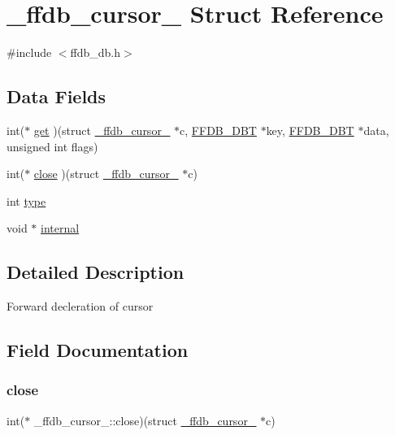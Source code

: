 \hypertarget{struct__ffdb__cursor__}{}\section{\+\_\+ffdb\+\_\+cursor\+\_\+ Struct Reference}
\label{struct__ffdb__cursor__}


{\ttfamily \#include $<$ffdb\+\_\+db.\+h$>$}

\subsection*{Data Fields}
\begin{DoxyCompactItemize}
\item 
int($\ast$ \mbox{\hyperlink{struct__ffdb__cursor___a775458eba1f9b1d69b9b394faaf31ae2}{get}} )(struct \mbox{\hyperlink{struct__ffdb__cursor__}{\+\_\+ffdb\+\_\+cursor\+\_\+}} $\ast$c, \mbox{\hyperlink{other__libs_2filedb_2filehash_2ffdb__db_8h_aa2e0984399491df0fdd20898ca8758f9}{F\+F\+D\+B\+\_\+\+D\+BT}} $\ast$key, \mbox{\hyperlink{other__libs_2filedb_2filehash_2ffdb__db_8h_aa2e0984399491df0fdd20898ca8758f9}{F\+F\+D\+B\+\_\+\+D\+BT}} $\ast$data, unsigned int flags)
\item 
int($\ast$ \mbox{\hyperlink{struct__ffdb__cursor___a68eb849c2cd709a772c6168920d98c66}{close}} )(struct \mbox{\hyperlink{struct__ffdb__cursor__}{\+\_\+ffdb\+\_\+cursor\+\_\+}} $\ast$c)
\item 
int \mbox{\hyperlink{struct__ffdb__cursor___a19f215e12f2d09687f089c87c7b00f29}{type}}
\item 
void $\ast$ \mbox{\hyperlink{struct__ffdb__cursor___a1c07d3b46c0463000411b3a8819f928e}{internal}}
\end{DoxyCompactItemize}


\subsection{Detailed Description}
Forward decleration of cursor 

\subsection{Field Documentation}
\mbox{\label{struct__ffdb__cursor___a68eb849c2cd709a772c6168920d98c66}} 
\subsubsection{\texorpdfstring{close}{close}}
{\footnotesize\ttfamily int($\ast$ \+\_\+ffdb\+\_\+cursor\+\_\+\+::close)(struct \mbox{\hyperlink{struct__ffdb__cursor__}{\+\_\+ffdb\+\_\+cursor\+\_\+}} $\ast$c)}

